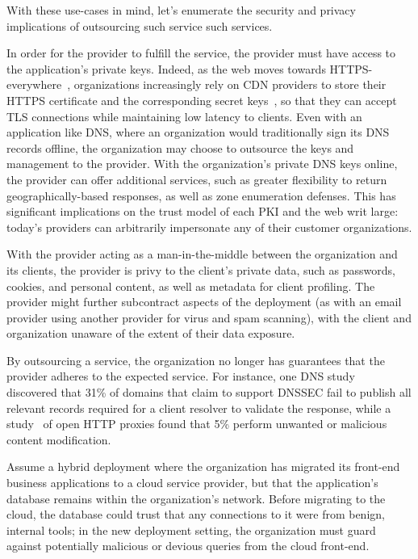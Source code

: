 With these use-cases in mind, let's enumerate the security and privacy
implications of outsourcing such service such services.


%
In order for the provider to fulfill the service, the provider must
have access to the application's private keys.
%
Indeed, as the web moves towards HTTPS-everywhere~\cite{felt-2017-https},
organizations increasingly rely on CDN providers to store their HTTPS
certificate and the corresponding secret keys~\cite{key-sharing,
when-https-meets-cdn}, so that they can accept TLS connections while
maintaining low latency to clients.
%
Even with an application like DNS, where an organization would traditionally sign
its DNS records offline, the organization may choose to outsource the keys
and management to the provider.
%
With the organization's private DNS keys online, the provider can offer
additional services, such as greater flexibility to return geographically-based
responses, as well as zone enumeration defenses.
%
This has significant implications on the trust model of each PKI and the web
writ large: today's providers can arbitrarily impersonate any of their customer
organizations.


%
With the provider acting as a man-in-the-middle between the
organization and its clients, the provider is privy to the client's private
data, such as passwords, cookies, and personal content, as well as metadata 
for client profiling.
%
The provider might further subcontract aspects of the deployment (as with an
email provider using another provider for virus and spam scanning), with
the client and organization unaware of the extent of their data exposure.


%
By outsourcing a service, the organization no longer has guarantees that the
provider adheres to the expected service.
%
For instance, one DNS study~\cite{chung-2017-dnssec} discovered that 31\% of
domains that claim to support DNSSEC fail to publish all relevant records
required for a client resolver to validate the response, while
a study~\cite{open-http-proxies} of open HTTP proxies found that 5\% perform
unwanted or malicious content modification.


%
Assume a hybrid deployment where the organization has migrated its front-end
business applications to a cloud service provider, but that the application's
database remains within the organization’s network. 
%
Before migrating to the cloud, the database could trust that any connections to
it were from benign, internal tools; in the new deployment setting, the
organization must guard against potentially malicious or devious queries from
the cloud front-end.


